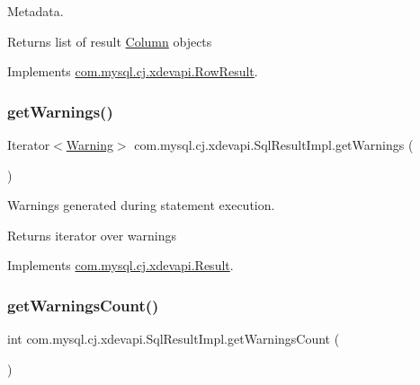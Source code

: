 Metadata.

\begin{DoxyReturn}{Returns}
list of result \mbox{\hyperlink{interfacecom_1_1mysql_1_1cj_1_1xdevapi_1_1_column}{Column}} objects 
\end{DoxyReturn}


Implements \mbox{\hyperlink{interfacecom_1_1mysql_1_1cj_1_1xdevapi_1_1_row_result_a4bd495dadd5549516c0f32366f8d77c7}{com.\+mysql.\+cj.\+xdevapi.\+Row\+Result}}.

\mbox{\label{classcom_1_1mysql_1_1cj_1_1xdevapi_1_1_sql_result_impl_a58d7c6a9ad8d87b5447c2d2f5849ee73}} 
\subsubsection{\texorpdfstring{get\+Warnings()}{getWarnings()}}
{\footnotesize\ttfamily Iterator$<$\mbox{\hyperlink{interfacecom_1_1mysql_1_1cj_1_1protocol_1_1_warning}{Warning}}$>$ com.\+mysql.\+cj.\+xdevapi.\+Sql\+Result\+Impl.\+get\+Warnings (\begin{DoxyParamCaption}{ }\end{DoxyParamCaption})}

Warnings generated during statement execution.

\begin{DoxyReturn}{Returns}
iterator over warnings 
\end{DoxyReturn}


Implements \mbox{\hyperlink{interfacecom_1_1mysql_1_1cj_1_1xdevapi_1_1_result_a7bd12aba36fc02a31c8fd546fe731e98}{com.\+mysql.\+cj.\+xdevapi.\+Result}}.

\mbox{\label{classcom_1_1mysql_1_1cj_1_1xdevapi_1_1_sql_result_impl_aec69633fd00fa0b998014ea8f94cc797}} 
\subsubsection{\texorpdfstring{get\+Warnings\+Count()}{getWarningsCount()}}
{\footnotesize\ttfamily int com.\+mysql.\+cj.\+xdevapi.\+Sql\+Result\+Impl.\+get\+Warnings\+Count (\begin{DoxyParamCaption}{ }\end{DoxyParamCaption})}

